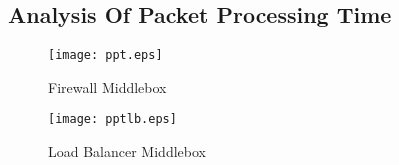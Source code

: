 \documentclass[a4paper,11pt]{report}
\begin{document}
\subsection{Analysis Of Packet Processing Time}
\begin{figure}[h]
\centering
\texttt{[image: ppt.eps]}
\caption{Firewall Middlebox}
\end{figure}
\begin{figure}[h]
\centering
\texttt{[image: pptlb.eps]}
\caption{Load Balancer Middlebox}
\end{figure}
 
\end{document}
